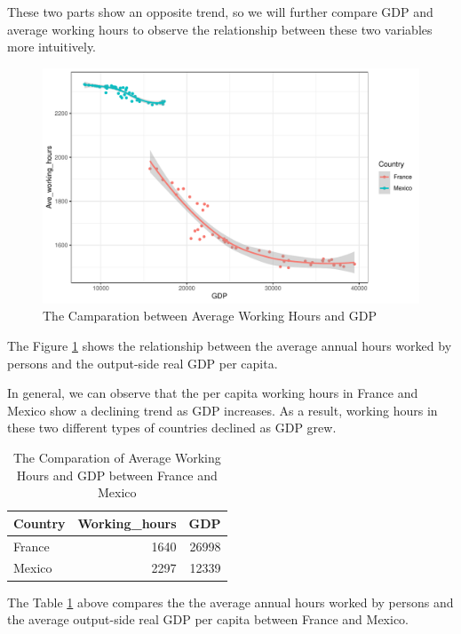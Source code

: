 \documentclass[11pt,a4paper,]{article}
\begin{document}
These two parts show an opposite trend, so we will further compare GDP and average working hours to observe the relationship between these two variables more intuitively.

\begin{figure}

{\centering \includegraphics{report_files/figure-latex/relationship-1} 

}

\caption{The Camparation between Average Working Hours and GDP}\label{fig:relationship}
\end{figure}

The Figure \ref{fig:relationship} shows the relationship between the average annual hours worked by persons and the output-side real GDP per capita.

In general, we can observe that the per capita working hours in France and Mexico show a declining trend as GDP increases. As a result, working hours in these two different types of countries declined as GDP grew.

\clearpage

\begin{table}

\caption{\label{tab:comparation}The Comparation of Average Working Hours and GDP between France and Mexico}
\centering
\begin{tabular}[t]{lrr}
\toprule
Country & Working\_hours & GDP\\
\midrule
France & 1640 & 26998\\
Mexico & 2297 & 12339\\
\bottomrule
\end{tabular}
\end{table}

The Table \ref{tab:comparation} above compares the the average annual hours worked by persons and the average output-side real GDP per capita between France and Mexico.
\end{document}
